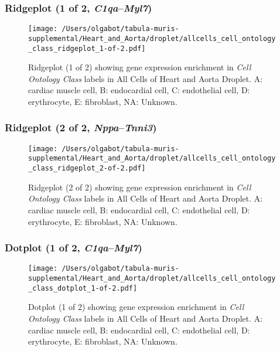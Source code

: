 \clearpage

\subsubsection{Ridgeplot (1 of 2, \emph{C1qa}--\emph{Myl7})}
\begin{figure}[h]
\centering
\texttt{[image: /Users/olgabot/tabula-muris-supplemental/Heart\_and\_Aorta/droplet/allcells\_cell\_ontology\_class\_ridgeplot\_1-of-2.pdf]}

\caption{ Ridgeplot (1 of 2)  showing gene expression enrichment in \emph{Cell Ontology Class} labels in All Cells of Heart and Aorta Droplet. A: cardiac muscle cell, B: endocardial cell, C: endothelial cell, D: erythrocyte, E: fibroblast, NA: Unknown.}
\end{figure}


\clearpage

\subsubsection{Ridgeplot (2 of 2, \emph{Nppa}--\emph{Tnni3})}
\begin{figure}[h]
\centering
\texttt{[image: /Users/olgabot/tabula-muris-supplemental/Heart\_and\_Aorta/droplet/allcells\_cell\_ontology\_class\_ridgeplot\_2-of-2.pdf]}

\caption{ Ridgeplot (2 of 2)  showing gene expression enrichment in \emph{Cell Ontology Class} labels in All Cells of Heart and Aorta Droplet. A: cardiac muscle cell, B: endocardial cell, C: endothelial cell, D: erythrocyte, E: fibroblast, NA: Unknown.}
\end{figure}


\clearpage

\subsubsection{Dotplot (1 of 2, \emph{C1qa}--\emph{Myl7})}
\begin{figure}[h]
\centering
\texttt{[image: /Users/olgabot/tabula-muris-supplemental/Heart\_and\_Aorta/droplet/allcells\_cell\_ontology\_class\_dotplot\_1-of-2.pdf]}

\caption{ Dotplot (1 of 2)  showing gene expression enrichment in \emph{Cell Ontology Class} labels in All Cells of Heart and Aorta Droplet. A: cardiac muscle cell, B: endocardial cell, C: endothelial cell, D: erythrocyte, E: fibroblast, NA: Unknown.}
\end{figure}


